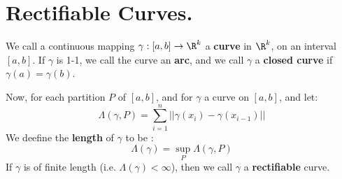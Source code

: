 
\section{Rectifiable Curves.}

\begin{definition}
    We call a continuous mapping $\gamma:[a,b] \rightarrow \R^k$ a
    \textbf{curve} in $\R^k$, on  an interval $[a,b]$. If  $\gamma$ is 1-1, we
    call the curve an \textbf{arc}, and we call  $\gamma$ a \textbf{closed
    curve} if  $\gamma(a)=\gamma(b)$.

    Now, for each partition $P$ of  $[a,b]$, and for  $\gamma$ a curve on
    $[a,b]$, and let:
        \begin{equation}
            \Lambda(\gamma,P)=\sum_{i=1}^{n}{||\gamma(x_i)-\gamma(x_{i-1})||}
        \end{equation}
    We deefine the \textbf{length} of $\gamma$ to be :
        \begin{equation}
            \Lambda(\gamma)=\sup_{P}{\Lambda(\gamma,P)}
        \end{equation}
        If $\gamma$ is of finite length  (i.e. $\Lambda(\gamma)<\infty$), then
        we call $\gamma$ a \textbf{rectifiable} curve.
\end{definition}

